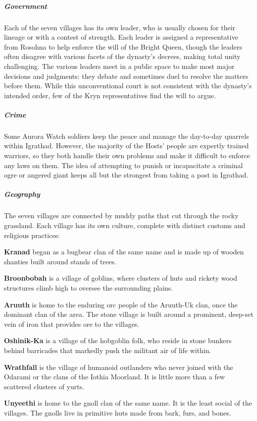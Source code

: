 \documentclass[10pt,a4paper,twoside,bg=print,twocolumn,openany,nodeprecatedcode]{dndbook}
\begin{document}
\subparagraph{Government}
Each of the seven villages has its own leader, who is usually chosen for their lineage or with a contest of strength. Each leader is assigned a representative from Rosohna to help enforce the will of the Bright Queen, though the leaders often disagree with various facets of the dynasty's decrees, making total unity challenging. The various leaders meet in a public space to make most major decisions and judgments: they debate and sometimes duel to resolve the matters before them. While this unconventional court is not consistent with the dynasty's intended order, few of the Kryn representatives find the will to argue.

\subparagraph{Crime}
Some Aurora Watch soldiers keep the peace and manage the day-to-day quarrels within Igrathad. However, the majority of the Hosts' people are expertly trained warriors, so they both handle their own problems and make it difficult to enforce any laws on them. The idea of attempting to punish or incapacitate a criminal ogre or angered giant keeps all but the strongest from taking a post in Igrathad.

\subparagraph{Geography}
The seven villages are connected by muddy paths that cut through the rocky grassland. Each village has its own culture, complete with distinct customs and religious practices:

\textbf{Kranad} began as a bugbear clan of the same name and is made up of wooden shanties built around stands of trees.

\textbf{Broonbobah} is a village of goblins, where clusters of huts and rickety wood structures climb high to oversee the surrounding plains.

\textbf{Aruuth} is home to the enduring orc people of the Aruuth-Uk clan, once the dominant clan of the area. The stone village is built around a prominent, deep-set vein of iron that provides ore to the villages.

\textbf{Oshinik-Ka} is a village of the hobgoblin folk, who reside in stone bunkers behind barricades that markedly push the militant air of life within.

\textbf{Wrathfall} is the village of humanoid outlanders who never joined with the Odarami or the clans of the Iothia Moorland. It is little more than a few scattered clusters of yurts.

\textbf{Unyeethi} is home to the gnoll clan of the same name. It is the least social of the villages. The gnolls live in primitive huts made from bark, furs, and bones.
\end{document}
